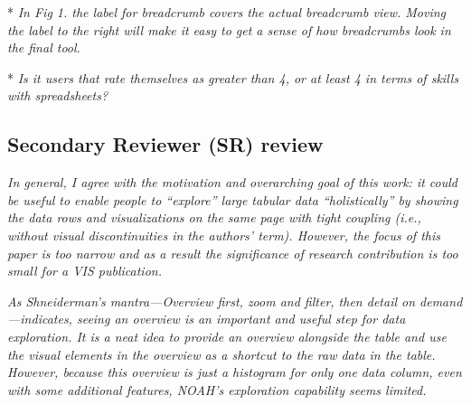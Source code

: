 
    * \textit{In Fig 1. the label for breadcrumb covers the actual breadcrumb view. Moving the
    label to the right will make it easy to get a sense of how breadcrumbs look in the
    final tool.}
    
     

    * \textit{Is it users that rate themselves as greater than 4, or at least 4 in terms of
    skills with spreadsheets?}
    
   

\subsection*{Secondary Reviewer (SR) review}

\textit{In general, I agree with the motivation and overarching goal of this work: it
    could be useful to enable people to “explore” large tabular data “holistically” by
    showing the data rows and visualizations on the same page with tight coupling
    (i.e., without visual discontinuities in the authors’ term). However, the focus of
    this paper is too narrow and as a result the significance of research contribution
    is too small for a VIS publication.}


 \textit{As Shneiderman’s mantra---Overview first, zoom and filter, then detail on demand---indicates, seeing an overview is an important and useful step for data exploration. It is a neat idea to provide an overview alongside the table and use the visual elements in the overview as a shortcut to the raw data in the table. However, because this overview is just a histogram for only one data column, even with some additional features, NOAH’s exploration capability seems limited.}

